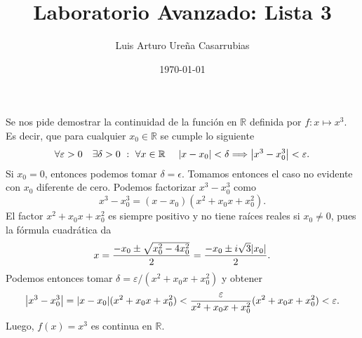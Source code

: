 \documentclass[11pt]{article}
\title{Laboratorio Avanzado: Lista 3}
\author{Luis Arturo Ureña Casarrubias}
\date{\today}
\newcommand{\R}{\mathbb R}
\DeclarePairedDelimiter{\abs}{\lvert }{\rvert}
\begin{document}
\maketitle

\begin{Exercise}\end{Exercise}

\begin{Answer}
	Se nos pide demostrar la continuidad de la función en $\R$ definida por $f : x \mapsto x^3$. Es decir, que para cualquier $x_0 \in \R$ se cumple lo siguiente
	\begin{equation}
		\forall \varepsilon > 0\quad \exists \delta > 0 \ : \ \forall x \in \R \quad \ \abs{x - x_0} < \delta \Longrightarrow \abs*{x^3 - x_0^3} < \varepsilon.
	\end{equation}
	Si $x_0 = 0$, entonces podemos tomar $\delta = \epsilon$. Tomamos entonces el caso no evidente con $x_0$ diferente de cero.
	Podemos factorizar $x^3 - x_0^3$ como
	\begin{equation}
		x^3 - x_0^3 = (x - x_0)(x^2 + x_0 x + x_0^2).
	\end{equation}
	El factor $x^2 + x_0 x + x_0^2$ es siempre positivo y no tiene raíces reales si $x_0 \neq 0$, pues la fórmula cuadrática da
	\begin{equation}
		x = \frac{-x_0 \pm \sqrt{x_0^2 - 4x_0^2}}{2} = \frac{-x_0 \pm i\sqrt 3 \abs{x_0}}{2}.
	\end{equation}
	Podemos entonces tomar $\delta = \varepsilon/(x^2 + x_0 x + x_0^2)$ y obtener
	\begin{equation}
		\abs*{x^3 - x_0^3} = \abs{x - x_0}(x^2 + x_0 x + x_0^2) <  \frac{\varepsilon}{x^2 + x_0 x + x_0^2}(x^2 + x_0 x + x_0^2) < \varepsilon.
	\end{equation}
	Luego, $f(x) = x^3$ es continua en $\R$.
\end{Answer}
\end{document}
